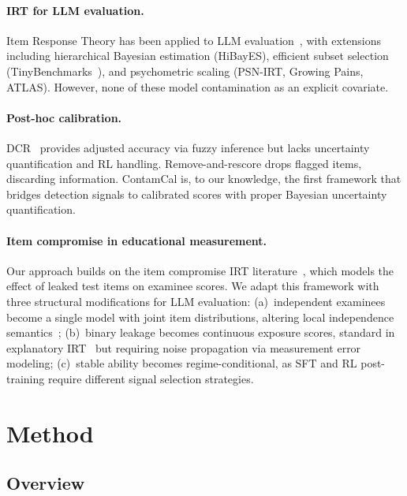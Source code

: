 \documentclass[letterpaper]{article}
\begin{document}
\paragraph{IRT for LLM evaluation.}
Item Response Theory has been applied to LLM evaluation~\citep{lalor2024benchmarking}, with extensions including hierarchical Bayesian estimation (HiBayES), efficient subset selection (TinyBenchmarks~\citep{polo2024tinybenchmarks}), and psychometric scaling (PSN-IRT, Growing Pains, ATLAS).
However, none of these model contamination as an explicit covariate.

\paragraph{Post-hoc calibration.}
DCR~\citep{dong2024generalization} provides adjusted accuracy via fuzzy inference but lacks uncertainty quantification and RL handling.
Remove-and-rescore drops flagged items, discarding information.
ContamCal is, to our knowledge, the first framework that bridges detection signals to calibrated scores with proper Bayesian uncertainty quantification.

\paragraph{Item compromise in educational measurement.}
Our approach builds on the item compromise IRT literature~\citep{eckerly2017detecting,sinharay2017assessing}, which models the effect of leaked test items on examinee scores.
We adapt this framework with three structural modifications for LLM evaluation: (a)~independent examinees become a single model with joint item distributions, altering local independence semantics~\citep{mislevy1986recent}; (b)~binary leakage becomes continuous exposure scores, standard in explanatory IRT~\citep{deboeck2004explanatory} but requiring noise propagation via measurement error modeling; (c)~stable ability becomes regime-conditional, as SFT and RL post-training require different signal selection strategies.

\section{Method}
\label{sec:method}

\subsection{Overview}
\end{document}
